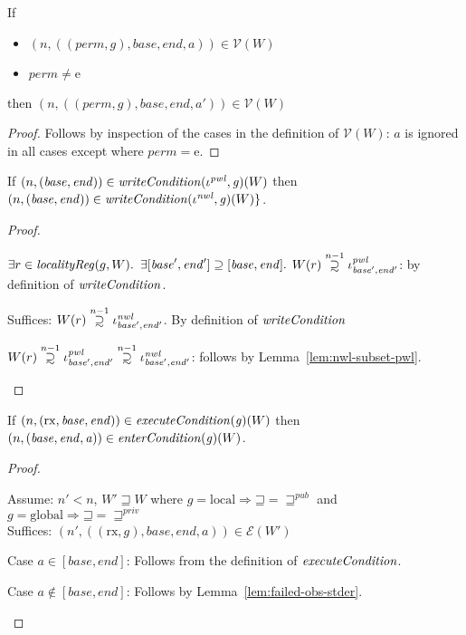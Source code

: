 \documentclass[a4paper]{article}
\newcommand\supsetsim{\mathrel{\ooalign{\raise.2ex\hbox{$\supset$}\cr
      \hidewidth\lower.8ex\hbox{\scalebox{0.9}{$\sim$}}\hidewidth\cr}}}
\newcommand{\nsupsim}[1][n]{\stackrel{\tiny{#1}}{\supsetsim}}
\newcommand{\var}[1]{\mathit{#1}}
\newcommand{\gl}{\var{g}}
\newcommand{\addr}{\var{a}}
\newcommand{\start}{\var{base}}
\newcommand{\addrend}{\var{end}}
\newcommand{\perm}{\var{perm}}
\newcommand{\nwl}{\var{nwl}}
\newcommand{\pwl}{\var{pwl}}
\newcommand{\plainfun}[2]{
  \ifthenelse{\equal{#2}{}}
  {\mathit{#1}}
  {\mathit{#1}(#2)}
}
\newcommand{\writeCond}[1]{\plainfun{writeCondition}{#1}}
\newcommand{\execCond}[1]{\plainfun{executeCondition}{#1}}
\newcommand{\entryCond}[1]{\plainfun{enterCondition}{#1}}
\newcommand{\future}{\mathbin{\sqsupseteq}}
\newcommand{\futurewk}{\mathbin{\sqsupseteq}^{\var{pub}}}
\newcommand{\futurestr}{\mathbin{\sqsupseteq}^{\var{priv}}}
\newcommand{\asmType}{\plaindom{AsmType}}
\newcommand{\plaindom}[1]{\mathrm{#1}}
\newcommand{\intr}[2]{\mathcal{#1}}
\newcommand{\valueintr}[1]{\intr{V}{#1}}
\newcommand{\exprintr}[1]{\intr{E}{#1}}
\newcommand{\stdvr}{\valueintr{\asmType}}
\newcommand{\stder}{\exprintr{\asmType}}
\newcommand{\npair}[2][n]{\left(#1,#2 \right)}
\newcommand{\plainperm}[1]{\mathrm{#1}}
\newcommand{\exec}{\plainperm{rx}}
\newcommand{\entry}{\plainperm{e}}
\newcommand{\local}{\plainperm{local}}
\newcommand{\glob}{\plainperm{global}}
\begin{document}
 \begin{lemma}
   \label{lem:conds-lea-suffice}
   If
   \begin{itemize}
   \item $\npair{((\perm,\gl),\start,\addrend,\addr)}\in\stdvr(W)$
   \item $\perm \neq \entry$
   \end{itemize}
 
   then $\npair{((\perm,\gl),\start,\addrend,\addr')} \in \stdvr(W)$
 \end{lemma}
 \begin{proof}
   Follows by inspection of the cases in the definition of $\stdvr(W)$: $a$ is
   ignored in all cases except where $\perm = \entry$.
 \end{proof}
 
 \begin{lemma}
   \label{lem:pwl-writecond-implies-nwl}
   If $\npair{(\start,\addrend)} \in \writeCond{}(\iota^\pwl,\gl)(W)$ then
   $\npair{(\start,\addrend)} \in \writeCond{}(\iota^\nwl,\gl)(W) \}$.
 \end{lemma}
 \begin{proof}
   \begin{enumproof}
   \item $\exists r \in \var{localityReg}(g,W) \ldotp$ $\exists
     [\start',\addrend'] \supseteq [\start,\addrend] \ldotp$ $W(r)\nsupsim[n-1]
     \iota^\pwl_{\start',\addrend'}$: by definition of $\writeCond{}$.
   \item Suffices: $W(r)\nsupsim[n-1] \iota^\nwl_{\start',\addrend'}$. By
     definition of $\writeCond{}$
   \item $W(r)\nsupsim[n-1] \iota^\pwl_{\start',\addrend'} \nsupsim[n-1]
     \iota^\nwl_{\start',\addrend'}$: follows by Lemma~\ref{lem:nwl-subset-pwl}.
   \end{enumproof}
 \end{proof}
 
 \begin{lemma}
   \label{lem:execCond-implies-entryCond}
   If $\npair{(\exec,\start,\addrend)} \in \execCond{}(\gl)(W)$ then
     $\npair{(\start,\addrend,\addr)} \in \entryCond{}(\gl)(W)$.
 \end{lemma}
 \begin{proof}
   \begin{enumproof}
   \item Assume: $n' < n$, $W' \future W$ where $\gl = \local \Rightarrow
     \future = \futurewk$ and $\gl = \glob \Rightarrow \future = \futurestr$
     \\
     Suffices: $\npair[n']{((\exec,\gl),\start,\addrend,\addr)} \in \stder(W')$
   \item Case $\addr \in [\start,\addrend]$: Follows from the definition of
     $\execCond{}$.
   \item Case $\addr \not\in[\start,\addrend]$: Follows by
     Lemma~\ref{lem:failed-obs-stder}.
   \end{enumproof}
 \end{proof}
 
\end{document}
